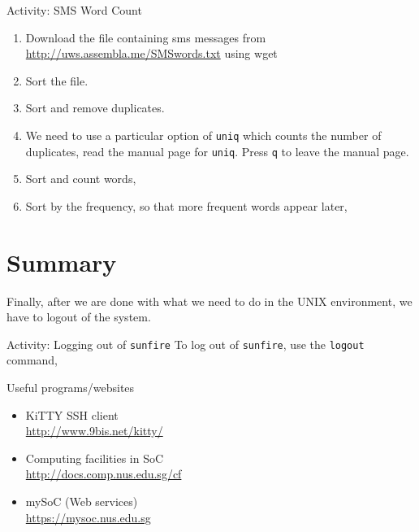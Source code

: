 \begin{frame}[allowframebreaks=0.6]{Activity: SMS Word Count}

\begin{enumerate}
\item Download the file containing sms messages from \url{http://uws.assembla.me/SMSwords.txt} using wget 
\item Sort the file.   
\item Sort and remove duplicates.    
\item We need to use a particular option of \texttt{uniq} which counts the
number of duplicates, read the manual page for \texttt{uniq}. Press \texttt{q}
to leave the manual page.  
\item Sort and count words,  
\item Sort by the frequency, so that more frequent words appear later, 
\end{enumerate}
\end{frame}

\section{Summary} %

\begin{frame}


\end{frame}

Finally, after we are done with what we need to do in the UNIX environment, we
have to logout of the system.  

\begin{frame}{Activity: Logging out of \texttt{sunfire}}
To log out of \texttt{sunfire}, use the \texttt{logout} command, 
\end{frame}

\begin{frame}{Useful programs/websites}
\begin{itemize}
\item KiTTY SSH client\\ \url{http://www.9bis.net/kitty/}
\item Computing facilities in SoC\\ \url{http://docs.comp.nus.edu.sg/cf}
\item mySoC (Web services)\\ \url{https://mysoc.nus.edu.sg}
\end{itemize}
\end{frame}
















